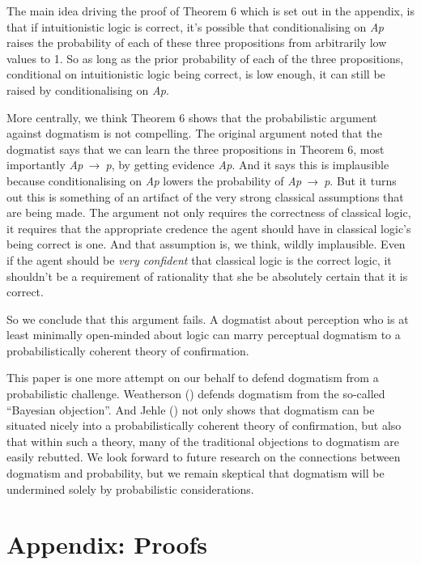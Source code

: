 \documentclass[
  10pt,
  letterpaper,
  DIV=11,
  numbers=noendperiod,
  twoside]{scrartcl}
\begin{document}
The main idea driving the proof of Theorem 6 which is set out in the
appendix, is that if intuitionistic logic is correct, it's possible that
conditionalising on \emph{Ap} raises the probability of each of these
three propositions from arbitrarily low values to 1. So as long as the
prior probability of each of the three propositions, conditional on
intuitionistic logic being correct, is low enough, it can still be
raised by conditionalising on \emph{Ap}.

More centrally, we think Theorem 6 shows that the probabilistic argument
against dogmatism is not compelling. The original argument noted that
the dogmatist says that we can learn the three propositions in Theorem
6, most importantly \emph{Ap}~→~\emph{p}, by getting evidence \emph{Ap}.
And it says this is implausible because conditionalising on \emph{Ap}
lowers the probability of \emph{Ap}~→~\emph{p}. But it turns out this is
something of an artifact of the very strong classical assumptions that
are being made. The argument not only requires the correctness of
classical logic, it requires that the appropriate credence the agent
should have in classical logic's being correct is one. And that
assumption is, we think, wildly implausible. Even if the agent should be
\emph{very confident} that classical logic is the correct logic, it
shouldn't be a requirement of rationality that she be absolutely certain
that it is correct.

So we conclude that this argument fails. A dogmatist about perception
who is at least minimally open-minded about logic can marry perceptual
dogmatism to a probabilistically coherent theory of confirmation.

This paper is one more attempt on our behalf to defend dogmatism from a
probabilistic challenge. Weatherson
() defends dogmatism from the
so-called ``Bayesian objection''. And Jehle
() not only shows that dogmatism can be
situated nicely into a probabilistically coherent theory of
confirmation, but also that within such a theory, many of the
traditional objections to dogmatism are easily rebutted. We look forward
to future research on the connections between dogmatism and probability,
but we remain skeptical that dogmatism will be undermined solely by
probabilistic considerations.

\section*{Appendix: Proofs}\label{appendix-proofs}
\end{document}
